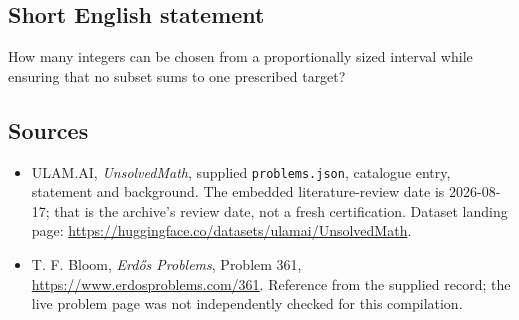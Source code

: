 \documentclass[11pt,a4paper]{article}
\begin{document}
\subsection{Short English statement}

How many integers can be chosen from a proportionally sized interval while ensuring that no subset sums to one prescribed target?

\subsection{Sources}

{\small

\begin{itemize}

\item[\hypertarget{source:statement:1}{S1}] ULAM.AI, \emph{UnsolvedMath}, supplied \texttt{problems.json}, catalogue entry, statement and background. The embedded literature-review date is 2026-08-17; that is the archive’s review date, not a fresh certification. Dataset landing page: \url{https://huggingface.co/datasets/ulamai/UnsolvedMath}.

\item[\hypertarget{source:statement:2}{S2}] T. F. Bloom, \emph{Erdős Problems}, Problem 361, \url{https://www.erdosproblems.com/361}. Reference from the supplied record; the live problem page was not independently checked for this compilation.

\end{itemize}

}

\label{end:statement}
\end{document}
